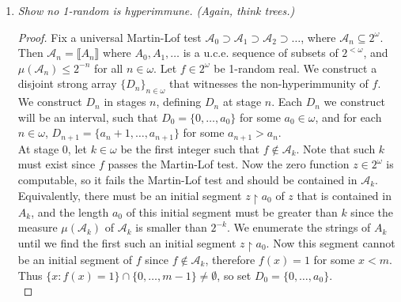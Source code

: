 \documentclass{article}
\begin{document}
\begin{enumerate}
  \item \it Show no 1-random is hyperimmune. (Again, think trees.)
    \begin{proof}
      Fix a universal Martin-Lof test
      $\mathcal{A}_0\supset\mathcal{A}_1\supset\mathcal{A}_2\supset\ldots$,
      where $\mathcal{A}_n\subseteq2^\omega$. Then $\mathcal{A}_n
      =\llbracket A_n\rrbracket$ where $A_0,A_1,\ldots$ is a u.c.e.
      sequence of subsets of $2^{<\omega}$, and
      $\mu(\mathcal{A}_n)\leq2^{-n}$ for all $n\in\omega$. Let
      $f\in2^\omega$ be 1-random real. We construct a disjoint strong array
      $\{D_n\}_{n\in\omega}$ that witnesses the non-hyperimmunity of $f$.
      We construct $D_n$ in stages $n$, defining $D_n$ at stage $n$. Each
      $D_n$ we construct will be an interval, such that
      $D_0=\{0,\ldots,a_0\}$ for some $a_0\in\omega$, and for each
      $n\in\omega$, $D_{n+1}=\{a_n+1,\ldots,a_{n+1}\}$ for some
      $a_{n+1}>a_n$. \\

      At stage 0, let $k\in\omega$ be the first integer such that
      $f\not\in \mathcal{A}_k$. Note that such $k$ must exist since $f$
      passes the Martin-Lof test. Now the zero function $z\in2^\omega$ is
      computable, so it fails the Martin-Lof test and should be contained
      in $\mathcal{A}_k$. Equivalently, there must be an initial segment
      $z\restriction a_0$ of $z$ that is contained in $A_k$, and the length
      $a_0$ of this initial segment must be greater than $k$ since the
      measure $\mu(\mathcal{A}_k)$ of $\mathcal{A}_k$ is smaller than
      $2^{-k}$. We enumerate the strings of $A_k$ until we find the first
      such an initial segment $z\restriction a_0$. Now this segment cannot be
      an initial segment of $f$ since $f\not\in\mathcal{A}_k$, therefore
      $f(x)=1$ for some $x<m$. Thus
      $\{x:f(x)=1\}\cap\{0,\ldots,m-1\}\neq\emptyset$, so set
      $D_0=\{0,\ldots,a_0\}$. \\


\end{proof}
\end{enumerate}
\end{document}

